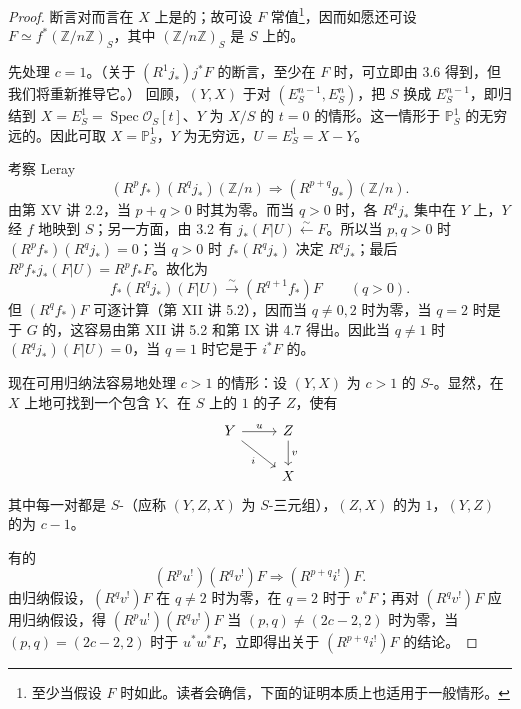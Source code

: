 \begin{proof}
断言对而言在 $X$ 上是的；故可设 $F$ 常值\footnote{至少当假设 $F$ 时如此。读者会确信，下面的证明本质上也适用于一般情形。}，因而如愿还可设 $F\simeq f^*(\mathbb Z/n\mathbb Z)_S$，其中 $(\mathbb Z/n\mathbb Z)_S$ 是 $S$ 上的。

先处理 $c=1$。（关于 $(R^1j_*)j^*F$ 的断言，至少在 $F$ 时，可立即由 3.6 得到，但我们将重新推导它。）
回顾，$(Y,X)$ 于对 $(E_S^{n-1},E_S^n)$，把 $S$ 换成 $E_S^{n-1}$，即归结到 $X=E_S^1=\operatorname{Spec}\mathcal O_S[t]$、$Y$ 为 $X/S$ 的 $t=0$ 的情形。这一情形于 $\mathbb P_S^1$ 的无穷远的。因此可取 $X=\mathbb P_S^1$，$Y$ 为无穷远，$U=E_S^1=X-Y$。

考察 Leray 
\[
(R^pf_*)(R^qj_*)(\mathbb Z/n)\Longrightarrow(R^{p+q}g_*)(\mathbb Z/n).
\]
由第 XV 讲 2.2，当 $p+q>0$ 时其为零。而当 $q>0$ 时，各 $R^qj_*$ 集中在 $Y$ 上，$Y$ 经 $f$ 地映到 $S$；另一方面，由 3.2 有 $j_*(F|U)\xleftarrow{\sim}F$。所以当 $p,q>0$ 时 $(R^pf_*)(R^qj_*)=0$；当 $q>0$ 时 $f_*(R^qj_*)$ 决定 $R^qj_*$；最后 $R^pf_*j_*(F|U)=R^pf_*F$。故化为
\[
f_*(R^qj_*)(F|U)\xrightarrow{\sim}(R^{q+1}f_*)F\qquad(q>0).
\]
但 $(R^qf_*)F$ 可逐计算（第 XII 讲 5.2），因而当 $q\ne0,2$ 时为零，当 $q=2$ 时是于 $G$ 的，这容易由第 XII 讲 5.2 和第 IX 讲 4.7 得出。因此当 $q\ne1$ 时 $(R^qj_*)(F|U)=0$，当 $q=1$ 时它是于 $i^*F$ 的。

现在可用归纳法容易地处理 $c>1$ 的情形：设 $(Y,X)$ 为 $c>1$ 的 $S$-。显然，在 $X$ 上地可找到一个包含 $Y$、在 $S$ 上的 $1$ 的子 $Z$，使有
\[
\begin{tikzcd}
Y\arrow[r,"u"]\arrow[dr,"i"']&Z\arrow[d,"v"]\\&X
\end{tikzcd}
\]
其中每一对都是 $S$-（应称 $(Y,Z,X)$ 为 $S$-三元组），$(Z,X)$ 的为 $1$，$(Y,Z)$ 的为 $c-1$。

有的
\[
(R^pu^!)(R^qv^!)F\Longrightarrow(R^{p+q}i^!)F.
\]
由归纳假设，$(R^qv^!)F$ 在 $q\ne2$ 时为零，在 $q=2$ 时于 $v^*F$；再对 $(R^qv^!)F$ 应用归纳假设，得 $(R^pu^!)(R^qv^!)F$ 当 $(p,q)\ne(2c-2,2)$ 时为零，当 $(p,q)=(2c-2,2)$ 时于 $u^*w^*F$，立即得出关于 $(R^{p+q}i^!)F$ 的结论。
\end{proof}
